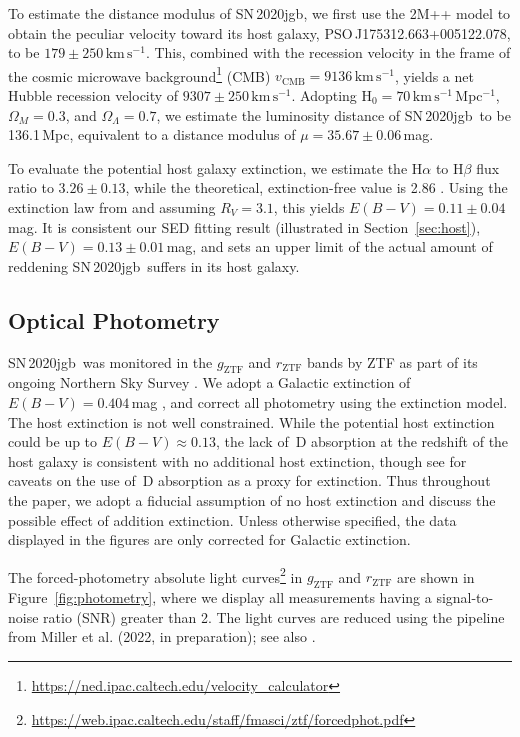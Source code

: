 \documentclass[twocolumn]{aastex631}
\newcommand{\sn}{SN\,2020jgb}
\newcommand{\kms}{$\mathrm{km}\,\mathrm{s}^{-1}$}
\begin{document}
To estimate the distance modulus of \sn, we first use the 2M++ model \citep{Carrick2015_2M++} to obtain the peculiar velocity toward its host galaxy, PSO\,J175312.663+005122.078, to be $179\pm250$\,\kms. This, combined with the recession velocity in the frame of the cosmic microwave background\footnote{\url{https://ned.ipac.caltech.edu/velocity_calculator}} (CMB) $v_\mathrm{CMB}=9136$\,\kms, yields a net Hubble recession velocity of $9307\pm250$\,\kms. Adopting H$_0=70$\,\kms\,Mpc$^{-1}$, $\Omega_M=0.3$, and $\Omega_\Lambda=0.7$, we estimate the luminosity distance of \sn\ to be 136.1\,Mpc, equivalent to a distance modulus of $\mu=35.67\pm0.06$\,mag.

To evaluate the potential host galaxy extinction, we estimate the H$\alpha$ to H$\beta$ flux ratio to $3.26\pm0.13$, while the theoretical, extinction-free value is 2.86 \citep[assuming case B recombination;][]{Osterbrock_2006}. Using the extinction law from \citet{Fitzpatrick1999} and assuming $R_V=3.1$, this yields $E(B-V)=0.11\pm0.04$\,mag. It is consistent our SED fitting result (illustrated in Section~\ref{sec:host}), $E(B-V)=0.13\pm0.01$\,mag, and sets an upper limit of the actual amount of reddening \sn\ suffers in its host galaxy.


\subsection{Optical Photometry}
\sn\ was monitored in the $g_\mathrm{ZTF}$ and $r_\mathrm{ZTF}$ bands by ZTF as part of its ongoing Northern Sky Survey \citep{Bellm_ZTF_2019b}. We adopt a Galactic extinction of $E(B-V)=0.404\,$mag \citep{Schlafly2011}, and correct all photometry using the \citet{Fitzpatrick1999} extinction model. The host extinction is not well constrained. While the potential host extinction could be up to $E(B-V)\approx0.13$, the lack of \,D absorption at the redshift of the host galaxy is consistent with no additional host extinction, though see \citet{Poznanski_2011} for caveats on the use of \,D absorption as a proxy for extinction. Thus throughout the paper, we adopt a fiducial assumption of no host extinction and discuss the possible effect of addition extinction. Unless otherwise specified, the data displayed in the figures are only corrected for Galactic extinction.

The forced-photometry absolute light curves\footnote{\url{https://web.ipac.caltech.edu/staff/fmasci/ztf/forcedphot.pdf}} in $g_\mathrm{ZTF}$ and $r_\mathrm{ZTF}$ are shown in Figure~\ref{fig:photometry}, where we display all measurements having a signal-to-noise ratio (SNR) greater than 2. The light curves are reduced using the pipeline from Miller et al. (2022, in preparation); see also \citet{Yao_2019}.
\end{document}
